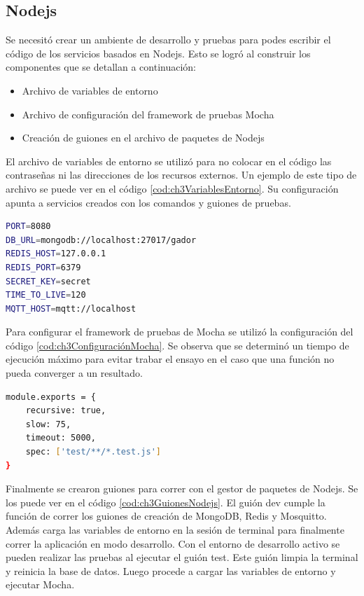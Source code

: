 \subsection{Nodejs}
Se necesitó crear un ambiente de desarrollo y pruebas para podes escribir el código de los servicios basados en Nodejs.
Esto se logró al construir los componentes que se detallan a continuación:
\begin{itemize}
	\item Archivo de variables de entorno
	\item Archivo de configuración del framework de pruebas Mocha
	\item Creación de guiones en el archivo de paquetes de Nodejs
\end{itemize}

El archivo de variables de entorno se utilizó para no colocar en el código las contraseñas ni las direcciones de los recursos externos.
Un ejemplo de este tipo de archivo se puede ver en el código \ref{cod:ch3VariablesEntorno}. Su configuración apunta a servicios creados con los comandos y guiones de pruebas.

\begin{lstlisting}[language=bash,label=cod:ch3VariablesEntorno,caption=Archivo de variables de entorno.]
PORT=8080
DB_URL=mongodb://localhost:27017/gador
REDIS_HOST=127.0.0.1
REDIS_PORT=6379
SECRET_KEY=secret
TIME_TO_LIVE=120
MQTT_HOST=mqtt://localhost
\end{lstlisting}

Para configurar el framework de pruebas de Mocha se utilizó la configuración del código \ref{cod:ch3ConfiguraciónMocha}.
Se observa que se determinó un tiempo de ejecución máximo para evitar trabar el ensayo en el caso que una función no pueda converger a un resultado.

\begin{lstlisting}[language=bash,label=cod:ch3ConfiguraciónMocha,caption=Configuración de Mocha.]
module.exports = {
    recursive: true,
    slow: 75,
    timeout: 5000,
    spec: ['test/**/*.test.js']
}
\end{lstlisting}

Finalmente se crearon guiones para correr con el gestor de paquetes de Nodejs.
Se los puede ver en el código \ref{cod:ch3GuionesNodejs}.
El guión dev cumple la función de correr los guiones de creación de MongoDB, Redis y Mosquitto.
Además carga las variables de entorno en la sesión de terminal para finalmente correr la aplicación en modo desarrollo.
Con el entorno de desarrollo activo se pueden realizar las pruebas al ejecutar el guión test.
Este guión limpia la terminal y reinicia la base de datos. Luego procede a cargar las variables de entorno y ejecutar Mocha.

